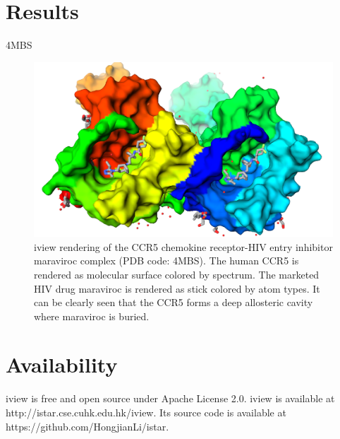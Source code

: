 \documentclass{bioinfo}
\begin{document}
\section{Results}

4MBS \citep{1348}

\begin{figure}%
\centerline{\includegraphics[width=\linewidth]{4MBS.png}}
\caption{iview rendering of the CCR5 chemokine receptor-HIV entry inhibitor maraviroc complex (PDB code: 4MBS). The human CCR5 is rendered as molecular surface colored by spectrum. The marketed HIV drug maraviroc is rendered as stick colored by atom types. It can be clearly seen that the CCR5 forms a deep allosteric cavity where maraviroc is buried.}\label{fig:4MBS}
\end{figure}

\section{Availability}

iview is free and open source under Apache License 2.0. iview is available at http://istar.cse.cuhk.edu.hk/iview. Its source code is available at https://github.com/HongjianLi/istar.




%
%
%
%
%
%


\end{document}
